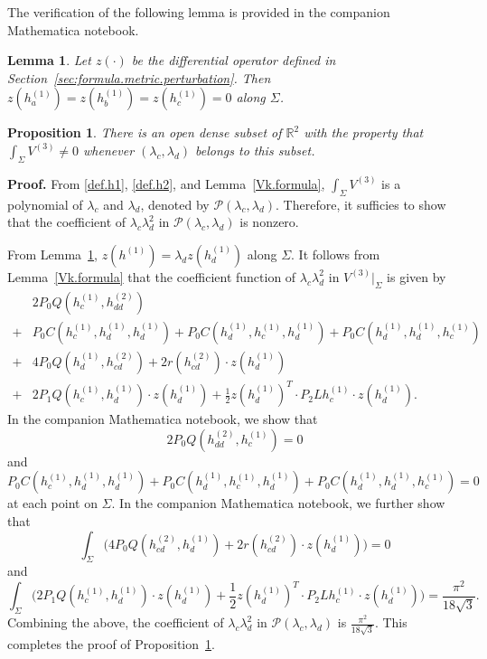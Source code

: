 \documentclass[11pt]{amsart}
\newtheorem{lemma}[theorem]{Lemma}
\newtheorem{proposition}[theorem]{Proposition}
\theoremstyle{definition}
\begin{document}
The verification of the following lemma is provided in the companion Mathematica notebook.
\begin{lemma}\label{za.zb.zc.vanish}
Let $z(\cdot)$ be the differential operator defined in Section~\ref{sec:formula.metric.perturbation}. 
Then $z(h^{(1)}_a)=z(h^{(1)}_b)=z(h^{(1)}_c)=0$ along $\Sigma$.
\end{lemma}


\begin{proposition}
\label{third.order.change.in.sectional.curvature}
There is an open dense subset of $\mathbb{R}^2$ with the property that $\int_\Sigma V^{(3)} \neq 0$ whenever $(\lambda_c,\lambda_d)$ belongs to this subset. 
\end{proposition}

\textbf{Proof.} 
From \eqref{def.h1}, \eqref{def.h2}, and Lemma~\ref{Vk.formula}, $\int_\Sigma V^{(3)}$ is a polynomial of $\lambda_c$ and $\lambda_d$, denoted by $\mathcal{P}(\lambda_c,\lambda_d)$.
Therefore, it sufficies to show that the coefficient of $\lambda_c\lambda_d^2$ in $\mathcal{P}(\lambda_c,\lambda_d)$ is nonzero. 

From Lemma~\ref{za.zb.zc.vanish}, $z(h^{(1)})=\lambda_d z(h^{(1)}_d)$ along $\Sigma$.
It follows from Lemma~\ref{Vk.formula} that the coefficient function of $\lambda_c\lambda_d^2$ in $V^{(3)}|_{\Sigma}$ is given by
\begin{align*}
&2 P_0Q(h^{(1)}_c,h^{(2)}_{dd}) \\
+&P_0C( h^{(1)}_c, h^{(1)}_d, h^{(1)}_d )+P_0C( h^{(1)}_d, h^{(1)}_c, h^{(1)}_d )+P_0C( h^{(1)}_d, h^{(1)}_d, h^{(1)}_c )\\
+&4 P_0Q(h^{(1)}_d,h^{(2)}_{cd})+2 r(h^{(2)}_{cd})\cdot z(h^{(1)}_d) \\
+&2 P_1Q(h^{(1)}_c, h^{(1)}_d)\cdot z(h^{(1)}_d)+ \frac{1}{2} z(h^{(1)}_d)^T \cdot P_2 Lh^{(1)}_c \cdot z(h^{(1)}_d).
\end{align*}
In the companion Mathematica notebook, we show that
\[2 P_0Q( h^{(2)}_{dd}, h^{(1)}_c)=0\] 
and 
\[P_0C( h^{(1)}_c, h^{(1)}_d, h^{(1)}_d )+P_0C( h^{(1)}_d, h^{(1)}_c, h^{(1)}_d )+P_0C( h^{(1)}_d, h^{(1)}_d, h^{(1)}_c)=0\] 
at each point on $\Sigma$. In the companion Mathematica notebook, we further show that
\[\int_\Sigma \big( 4 P_0Q( h^{(2)}_{cd}, h^{(1)}_d )+2 r(h^{(2)}_{cd})\cdot z(h^{(1)}_d) \big)=0\] 
and 
\[\int_\Sigma \Big ( 2 P_1Q(h^{(1)}_c, h^{(1)}_d)\cdot z(h^{(1)}_d)+\frac{1}{2} z(h^{(1)}_d)^T \cdot P_2 Lh^{(1)}_c \cdot z(h^{(1)}_d) \Big ) =\frac{\pi^2}{18\sqrt{3}}.\] 
Combining the above, the coefficient of $\lambda_c\lambda_d^2$ in $\mathcal{P}(\lambda_c,\lambda_d)$ is $\frac{\pi^2}{18\sqrt{3}}$. 
This completes the proof of Proposition~\ref{third.order.change.in.sectional.curvature}.\\
\end{document}
